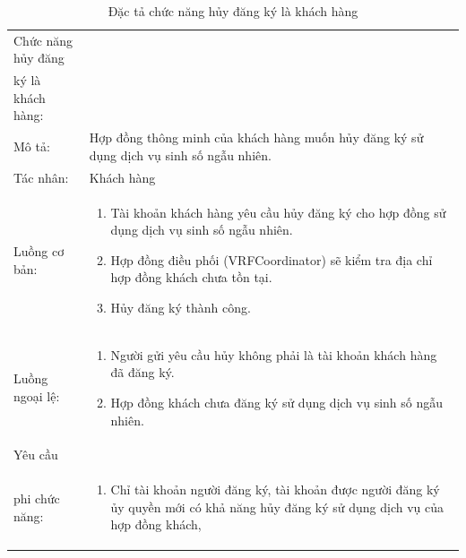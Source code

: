 \documentclass[../main.tex]{subfiles}
\begin{document}
\begin{table}[H]
\begin{tabularx}{\textwidth}{|l|X|}
Chức năng hủy đăng\\ký là khách hàng:  &  \\
Mô tả:                  &Hợp đồng thông minh của khách hàng muốn hủy đăng ký sử dụng dịch vụ sinh số ngẫu nhiên.\\
Tác nhân:               & Khách hàng \\
Luồng cơ bản:           &
\begin{enumerate}
    \item Tài khoản khách hàng yêu cầu hủy đăng ký cho hợp đồng sử dụng dịch vụ sinh số ngẫu nhiên.
    \item Hợp đồng điều phối (VRFCoordinator) sẽ kiểm tra địa chỉ hợp đồng khách chưa tồn tại.
    \item Hủy đăng ký thành công.
\end{enumerate}\\
Luồng ngoại lệ:         &
\begin{enumerate}
    \item Người gửi yêu cầu hủy không phải là tài khoản khách hàng đã đăng ký.
    \item Hợp đồng khách chưa đăng ký sử dụng dịch vụ sinh số ngẫu nhiên.
\end{enumerate}\\
Yêu cầu                 &\\
phi chức năng:           & 
\begin{enumerate}
    \item Chỉ tài khoản người đăng ký, tài khoản được người đăng ký ủy quyền mới có khả năng hủy đăng ký sử dụng dịch vụ của hợp đồng khách,
\end{enumerate}\\

\end{tabularx}
\caption{Đặc tả chức năng hủy đăng ký là khách hàng}
\label{table: 3}
\end{table}
\end{document}
